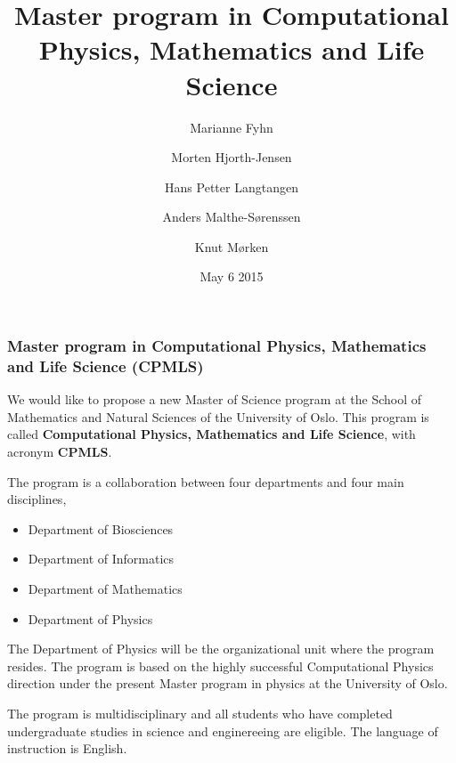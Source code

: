 \documentclass{beamer}
\begin{document}







\title{Master program in Computational Physics, Mathematics and Life Science}


\author{Marianne Fyhn
\and
Morten Hjorth-Jensen
\and
Hans Petter Langtangen
\and
Anders Malthe-Sørenssen
\and
Knut Mørken}

\date{May 6 2015
}

\begin{frame}
\titlepage
\end{frame}

\begin{frame}
\frametitle{Master program in Computational Physics, Mathematics and Life Science (CPMLS)}

\begin{block}{}
We would like to propose a new Master of Science program at the School of Mathematics and Natural Sciences of the University of Oslo. This program is called  \textbf{Computational Physics, Mathematics and Life Science}, with acronym  \textbf{CPMLS}. 

The program is a collaboration between four departments and four main disciplines,
\begin{itemize}
\item Department of Biosciences 

\item Department of Informatics

\item Department of Mathematics 

\item Department of Physics 
\end{itemize}

\noindent
The Department of Physics will be the organizational unit where the program resides. 
The program is based on the highly successful Computational Physics direction under the present Master program
in physics at the University of Oslo. 

The program is multidisciplinary and all students who have completed undergraduate studies in science and enginereeing are eligible.  The language of instruction is English.
\end{block}
\end{frame}
\end{document}
